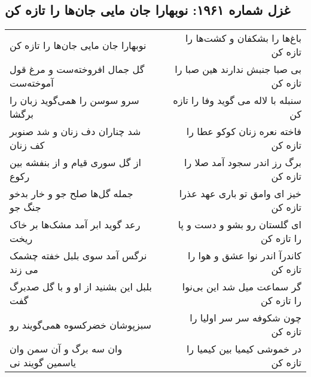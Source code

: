 \begin{center}
\section*{غزل شماره ۱۹۶۱: نوبهارا جان مایی جان‌ها را تازه کن}
\label{sec:1961}
\begin{longtable}{l p{0.5cm} r}
نوبهارا جان مایی جان‌ها را تازه کن
&&
باغ‌ها را بشکفان و کشت‌ها را تازه کن
\\
گل جمال افروخته‌ست و مرغ قول آموخته‌ست
&&
بی صبا جنبش ندارند هین صبا را تازه کن
\\
سرو سوسن را همی‌گوید زبان را برگشا
&&
سنبله با لاله می گوید وفا را تازه کن
\\
شد چناران دف زنان و شد صنوبر کف زنان
&&
فاخته نعره زنان کوکو عطا را تازه کن
\\
از گل سوری قیام و از بنفشه بین رکوع
&&
برگ رز اندر سجود آمد صلا را تازه کن
\\
جمله گل‌ها صلح جو و خار بدخو جنگ جو
&&
خیز ای وامق تو باری عهد عذرا تازه کن
\\
رعد گوید ابر آمد مشک‌ها بر خاک ریخت
&&
ای گلستان رو بشو و دست و پا را تازه کن
\\
نرگس آمد سوی بلبل خفته چشمک می زند
&&
کاندرآ اندر نوا عشق و هوا را تازه کن
\\
بلبل این بشنید از او و با گل صدبرگ گفت
&&
گر سماعت میل شد این بی‌نوا را تازه کن
\\
سبزپوشان خضرکسوه همی‌گویند رو
&&
چون شکوفه سر سر اولیا را تازه کن
\\
وان سه برگ و آن سمن وان یاسمین گویند نی
&&
در خموشی کیمیا بین کیمیا را تازه کن
\\
\end{longtable}
\end{center}
